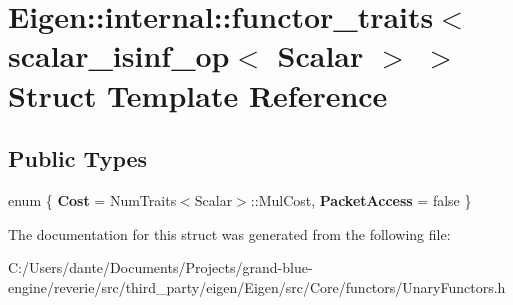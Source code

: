 \hypertarget{struct_eigen_1_1internal_1_1functor__traits_3_01scalar__isinf__op_3_01_scalar_01_4_01_4}{}\section{Eigen\+::internal\+::functor\+\_\+traits$<$ scalar\+\_\+isinf\+\_\+op$<$ Scalar $>$ $>$ Struct Template Reference}
\label{struct_eigen_1_1internal_1_1functor__traits_3_01scalar__isinf__op_3_01_scalar_01_4_01_4}
\subsection*{Public Types}
\begin{DoxyCompactItemize}
\item 
\mbox{\label{struct_eigen_1_1internal_1_1functor__traits_3_01scalar__isinf__op_3_01_scalar_01_4_01_4_aaeb06ed2374f59799f7129f604eb2f96}} 
enum \{ {\bfseries Cost} = Num\+Traits$<$Scalar$>$\+::Mul\+Cost, 
{\bfseries Packet\+Access} = false
 \}
\end{DoxyCompactItemize}


The documentation for this struct was generated from the following file\+:\begin{DoxyCompactItemize}
\item 
C\+:/\+Users/dante/\+Documents/\+Projects/grand-\/blue-\/engine/reverie/src/third\+\_\+party/eigen/\+Eigen/src/\+Core/functors/Unary\+Functors.\+h\end{DoxyCompactItemize}
